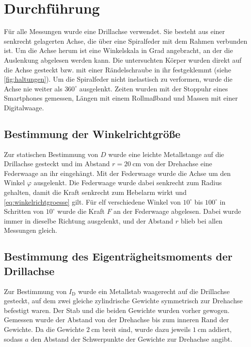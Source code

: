 \section{Durchführung}
\label{sec:Durchfuehrung}

Für alle Messungen wurde eine Drillachse verwendet.
Sie besteht aus einer senkrecht gelagerten Achse, die über eine Spiralfeder mit dem Rahmen verbunden ist.
Um die Achse herum ist eine Winkelskala in Grad angebracht, an der die Auslenkung abgelesen werden kann.
Die untersuchten Körper wurden direkt auf die Achse gesteckt bzw. mit einer Rändelschraube in ihr festgeklemmt (siehe \autoref{fig:haltungen}).
Um die Spiralfeder nicht inelastisch zu verformen, wurde die Achse nie weiter als $360^\circ$ ausgelenkt.
Zeiten wurden mit der Stoppuhr eines Smartphones gemessen, Längen mit einem Rollmaßband und Massen mit einer Digitalwaage.

\subsection{Bestimmung der Winkelrichtgröße}
\label{sec:durchf_D}

Zur statischen Bestimmung von $D$ wurde eine leichte Metallstange auf die Drillachse gesteckt
und im Abstand $r = \qty{20}{\centi\metre}$ von der Drehachse eine Federwaage an ihr eingehängt.
Mit der Federwaage wurde die Achse um den Winkel $\varphi$ ausgelenkt.
Die Federwaage wurde dabei senkrecht zum Radius gehalten, damit die Kraft senkrecht zum Hebelarm wirkt und \autoref{eq:winkelrichtgroesse} gilt.
Für elf verschiedene Winkel von $10^\circ$ bis $100^\circ$ in Schritten von $10^\circ$ wurde die Kraft $F$ an der Federwaage abgelesen.
Dabei wurde immer in dieselbe Richtung ausgelenkt, und der Abstand $r$ blieb bei allen Messungen gleich.

\subsection{Bestimmung des Eigenträgheitsmoments der Drillachse}
\label{sec:durchf_ID}

Zur Bestimmung von $I_\text{D}$ wurde ein Metallstab waagerecht auf die Drillachse gesteckt, auf dem zwei gleiche zylindrische Gewichte
symmetrisch zur Drehachse befestigt waren.
Der Stab und die beiden Gewichte wurden vorher gewogen.
Gemessen wurde der Abstand von der Drehachse bis zum inneren Rand der Gewichte.
Da die Gewichte $\qty{2}{\centi\metre}$ breit sind, wurde dazu jeweils $\qty{1}{\centi\metre}$ addiert,
sodass $a$ den Abstand der Schwerpunkte der Gewichte zur Drehachse angibt.

